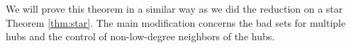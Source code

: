 \documentclass[a4paper]{article}
\theoremstyle{plain}
\theoremstyle{definition}
\newtheorem{rem}[theorem]{Remark}
\newcommand{\PP}{\mathbb{P}}
\newcommand{\T}{\mathbb{T}}
\begin{document}



We will prove this theorem in a similar way as we did the reduction on a star Theorem \ref{thm:star}. The main modification concerns the bad sets for multiple hubs and the control of non-low-degree neighbors of the hubs.
\end{document}
